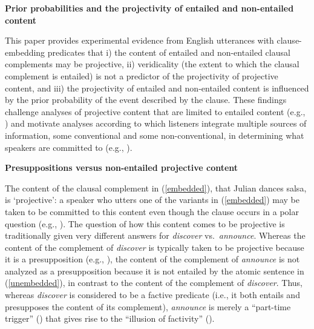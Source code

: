\documentclass[12pt,fleqn]{article}
\newcommand{\6}{\mbox{$[\hspace*{-.6mm}[$}}
\newcommand{\9}{\mbox{$]\hspace*{-.6mm}]$}}
\begin{document}
 
 
\begin{center}
{\large \bf Prior probabilities and the projectivity of entailed and non-entailed content}
\end{center}

This paper provides experimental evidence from English utterances with clause-embedding predicates that i) the content of entailed and non-entailed clausal complements may be projective, ii) veridicality (the extent to which the clausal complement is entailed) is not a predictor of the projectivity of projective content, and iii) the projectivity of entailed and non-entailed content is influenced by the prior probability of the event described by the clause. These findings challenge analyses of projective content that are limited to entailed content (e.g., \citealt{heim83,vds92}) and motivate analyses according to which listeners integrate multiple sources of information, some conventional and some non-conventional, in determining what speakers are committed to (e.g., \citealt{brst-salt10,brst-ar,abrusan2011,abrusan2013,tbd-variability}). 

{\bf Presuppositions versus non-entailed projective content} 

The content of the clausal complement in (\ref{embedded}), that Julian dances salsa, is `projective': a speaker who utters one of the variants in (\ref{embedded}) may be taken to be committed to this content even though the clause occurs in a polar question (e.g., \citealt{ccmg90}). The question of how this content comes to be projective is traditionally given very different answers for {\em discover} vs.\ {\em announce}. Whereas the content of the complement of {\em discover} is typically taken to be projective because it is a presupposition (e.g., \citealt{heim83,vds92}), the content of the complement of {\em announce} is not analyzed as a presupposition because it is not entailed by the atomic sentence in (\ref{unembedded}), in contrast to the content of the complement of {\em discover}. Thus, whereas {\em discover} is considered to be a factive predicate (i.e., it both entails and presupposes the content of its complement), {\em announce} is merely a ``part-time trigger'' (\citealt[139]{schlenker10}) that gives rise to the ``illusion of factivity'' (\citealt[76]{anand-hacquard2014}).
\end{document}
